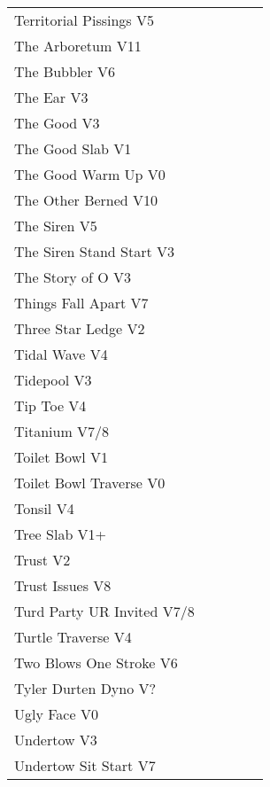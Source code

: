 \begin{flushleft}
\begin{center}
\begin{supertabular}{p{0.76\linewidth}p{0.08\linewidth}}
Territorial Pissings V5 & \pageref{rt:Territorial Pissings} \\
The Arboretum V11 & \pageref{rt:The Arboretum} \\
The Bubbler V6 & \pageref{rt:The Bubbler} \\
The Ear V3 & \pageref{rt:The Ear} \\
The Good V3 & \pageref{rt:The Good} \\
The Good Slab V1 & \pageref{rt:The Good Slab} \\
The Good Warm Up V0 & \pageref{rt:The Good Warm Up} \\
The Other Berned V10 & \pageref{rt:The Other Berned} \\
The Siren V5 & \pageref{rt:The Siren} \\
The Siren Stand Start V3 & \pageref{vr:The Siren Stand Start} \\
The Story of O V3 & \pageref{rt:The Story of O} \\
Things Fall Apart V7 & \pageref{rt:PA 2} \\
Three Star Ledge V2 & \pageref{rt:Three Star Ledge} \\
Tidal Wave V4 & \pageref{rt:DSD 3} \\
Tidepool V3 & \pageref{rt:Tidepool} \\
Tip Toe V4 & \pageref{rt:Tip Toe} \\
Titanium V7/8 & \pageref{rt:Titanium} \\
Toilet Bowl V1 & \pageref{rt:Toilet Bowl} \\
Toilet Bowl Traverse V0 & \pageref{rt:Toilet Bowl Traverse} \\
Tonsil V4 & \pageref{rt:Tonsil} \\
Tree Slab V1+ & \pageref{rt:Tree Slab} \\
Trust V2 & \pageref{rt:Trust} \\
Trust Issues V8 & \pageref{rt:Trust Issues} \\
Turd Party UR Invited V7/8 & \pageref{rt:Turd Party UR Invited} \\
Turtle Traverse V4 & \pageref{vr:Turtle Traverse} \\
Two Blows One Stroke V6 & \pageref{rt:Two Blows One Stroke} \\
Tyler Durten Dyno V? & \pageref{vr:Tyler Durten Dyno} \\
Ugly Face V0 & \pageref{rt:Ugly Face} \\
Undertow V3 & \pageref{rt:Undertow} \\
Undertow Sit Start V7 & \pageref{vr:Undertow Sit Start} \\

\end{supertabular}
\end{center}
\end{flushleft}
